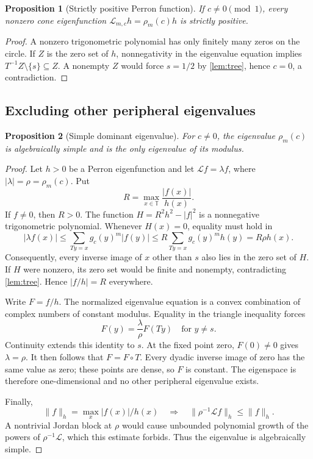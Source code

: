 \documentclass[11pt,a4paper]{article}
\numberwithin{equation}{section}
\newtheorem{proposition}[proposition]{Proposition}
\theoremstyle{definition}
\theoremstyle{remark}
\newcommand{\TT}{\mathbb T}
\newcommand{\Lop}{\mathcal L}
\begin{document}
\begin{proposition}[Strictly positive Perron function]
\label{prop:h-positive}
If $c\neq0\pmod1$, every nonzero cone eigenfunction
$\Lop_{m,c}h=\rho_m(c)h$ is strictly positive.
\end{proposition}
\begin{proof}
A nonzero trigonometric polynomial has only finitely many zeros on the
circle. If $Z$ is the zero set of $h$, nonnegativity in the eigenvalue
equation implies $T^{-1}Z\setminus\{s\}\subseteq Z$. A nonempty
$Z$ would force $s=1/2$ by \cref{lem:tree}, hence $c=0$, a contradiction.
\end{proof}

\subsection{Excluding other peripheral eigenvalues}
\begin{proposition}[Simple dominant eigenvalue]
\label{prop:peripheral}
For $c\neq0$, the eigenvalue $\rho_m(c)$ is algebraically simple and
is the only eigenvalue of its modulus.
\end{proposition}
\begin{proof}
Let $h>0$ be a Perron eigenfunction and let $\Lop f=\lambda f$,
where $|\lambda|=\rho=\rho_m(c)$. Put
\[
 R=\max_{x\in\TT}\frac{|f(x)|}{h(x)}.
\]
If $f\neq0$, then $R>0$. The function
$H=R^2h^2-|f|^2$ is a nonnegative trigonometric polynomial. Whenever
$H(x)=0$, equality must hold in
\[
 |\lambda f(x)|
 \leq\sum_{Ty=x}g_c(y)^m|f(y)|
 \leq R\sum_{Ty=x}g_c(y)^mh(y)
 =R\rho h(x).
\]
Consequently, every inverse image of $x$ other than $s$ also lies in
the zero set of $H$. If $H$ were nonzero, its zero set would be finite
and nonempty, contradicting \cref{lem:tree}. Hence $|f/h|=R$
everywhere.

Write $F=f/h$. The normalized eigenvalue equation is a convex
combination of complex numbers of constant modulus. Equality in the
triangle inequality forces
\[
 F(y)=\frac\lambda\rho F(Ty)
 \quad\text{for }y\neq s.
\]
Continuity extends this identity to $s$. At the fixed point zero,
$F(0)\neq0$ gives $\lambda=\rho$. It then follows that $F=F\circ T$.
Every dyadic inverse image of zero has the same value as zero; these
points are dense, so $F$ is constant. The eigenspace is therefore
one-dimensional and no other peripheral eigenvalue exists.

Finally,
\[
 \|f\|_h=\max_x|f(x)|/h(x)
 \quad\Longrightarrow\quad
 \|\rho^{-1}\Lop f\|_h\leq\|f\|_h.
\]
A nontrivial Jordan block at $\rho$ would cause unbounded polynomial
growth of the powers of $\rho^{-1}\Lop$, which this estimate forbids.
Thus the eigenvalue is algebraically simple.
\end{proof}
\end{document}
